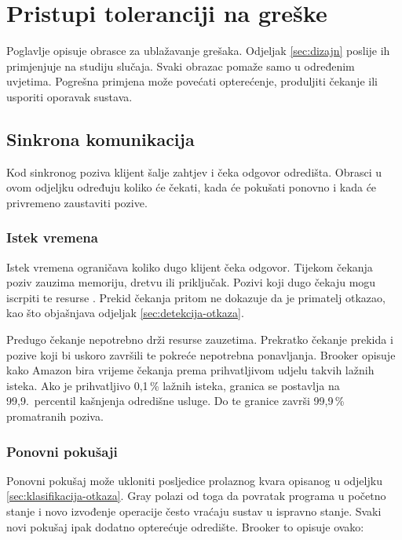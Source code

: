 \section{Pristupi toleranciji na greške}
\label{ch:pristupi}

Poglavlje opisuje obrasce za ublažavanje grešaka. Odjeljak
\ref{sec:dizajn} poslije ih primjenjuje na studiju slučaja. Svaki obrazac
pomaže samo u određenim uvjetima. Pogrešna primjena može povećati
opterećenje, produljiti čekanje ili usporiti oporavak sustava.

\subsection{Sinkrona komunikacija}
\label{sec:sinkrono}

Kod sinkronog poziva klijent šalje zahtjev i čeka odgovor odredišta.
Obrasci u ovom odjeljku određuju koliko će čekati, kada će pokušati ponovno
i kada će privremeno zaustaviti pozive.

\subsubsection*{Istek vremena}

Istek vremena ograničava koliko dugo klijent čeka odgovor. Tijekom čekanja
poziv zauzima memoriju, dretvu ili priključak. Pozivi koji dugo čekaju mogu
iscrpiti te resurse \cite{brookertimeouts}. Prekid čekanja pritom ne
dokazuje da je primatelj otkazao, kao što objašnjava odjeljak
\ref{sec:detekcija-otkaza}.

Predugo čekanje nepotrebno drži resurse zauzetima. Prekratko čekanje prekida
i pozive koji bi uskoro završili te pokreće nepotrebna ponavljanja. Brooker
opisuje kako Amazon bira vrijeme čekanja prema prihvatljivom udjelu takvih
lažnih isteka. Ako je prihvatljivo 0,1\,\% lažnih isteka, granica se postavlja
na 99,9.\ percentil kašnjenja odredišne usluge. Do te granice završi
99,9\,\% promatranih poziva.

\subsubsection*{Ponovni pokušaji}

Ponovni pokušaj može ukloniti posljedice prolaznog kvara opisanog u odjeljku
\ref{sec:klasifikacija-otkaza}. Gray polazi od toga da povratak programa u
početno stanje i novo izvođenje operacije često vraćaju sustav u ispravno
stanje. Svaki novi pokušaj ipak dodatno opterećuje odredište. Brooker to
opisuje ovako:

